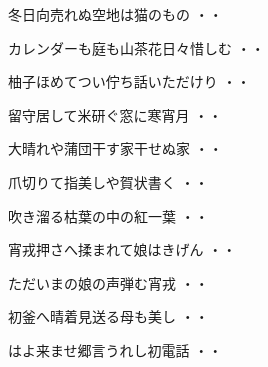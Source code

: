 \vspace{0.6cm}
\begin{shiika}冬日向売れぬ空地は猫のもの
\hfill{・・}\end{shiika}
\vspace{0.6cm}
\begin{shiika}カレンダーも庭も山茶花日々惜しむ
\hfill{・・}\end{shiika}
\vspace{0.6cm}
\begin{shiika}柚子ほめてつい佇ち話いただけり
\hfill{・・}\end{shiika}
\vspace{0.6cm}
\begin{shiika}留守居して米研ぐ窓に寒宵月
\hfill{・・}\end{shiika}
\vspace{0.6cm}
\begin{shiika}大晴れや蒲団干す家干せぬ家
\hfill{・・}\end{shiika}
\vspace{0.6cm}
\begin{shiika}爪切りて指美しや賀状書く
\hfill{・・}\end{shiika}
\vspace{0.6cm}
\begin{shiika}吹き溜る枯葉の中の紅一葉
\hfill{・・}\end{shiika}
\vspace{0.6cm}
\begin{shiika}宵戎押さへ揉まれて娘はきげん
\hfill{・・}\end{shiika}
\vspace{0.6cm}
\begin{shiika}ただいまの娘の声弾む宵戎
\hfill{・・}\end{shiika}
\vspace{0.6cm}
\begin{shiika}初釜へ晴着見送る母も美し
\hfill{・・}\end{shiika}
\vspace{0.6cm}
\begin{shiika}はよ来ませ郷言うれし初電話
\hfill{・・}\end{shiika}
